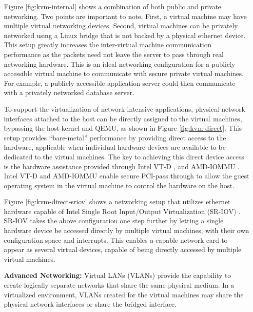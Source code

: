 \begin{enumerate}
Figure \ref{fig:kvm-internal} shows a combination of both public and private networking. Two points are important to note. First, a virtual machine may have multiple virtual networking devices. Second, virtual machines can be privately networked using a Linux bridge that is not backed by a physical ethernet device. This setup greatly increases the inter-virtual machine communication performance as the packets need not leave the server to pass through real networking hardware. This is an ideal networking configuration for a publicly accessible virtual machine to communicate with secure private virtual machines. For example, a publicly accessible application server could then communicate with a privately networked database server.



To support the virtualization of network-intensive applications, physical network interfaces attached to the host can be directly assigned to the virtual machines, bypassing the host kernel and QEMU, as shown in Figure \ref{fig:kvm-direct}. This setup provides ``bare-metal'' performance by providing direct access to the hardware, applicable when individual hardware devices are available to be dedicated to the virtual machines. The key to achieving this direct device access is the hardware assistance provided through Intel VT-D \cite{intelvtd}, and AMD-IOMMU \cite{amd-iommu}. Intel VT-D and AMD-IOMMU enable secure PCI-pass through to allow the guest operating system in the virtual machine to control the hardware on the host.



Figure \ref{fig:kvm-direct-sriov} shows a networking setup that utilizes ethernet hardware capable of Intel Single Root Input/Output Virtualization (SR-IOV) \cite{sr-iov_primer}. SR-IOV takes the above configuration one step further by letting a single hardware device be accessed directly by multiple virtual machines, with their own configuration space and interrupts. This enables a capable network card to appear as several virtual devices, capable of being directly accessed by multiple virtual machines.


\textbf{Advanced Networking: }  Virtual LANs (VLANs) provide the capability to create logically separate networks that share the same physical medium. In a virtualized environment, VLANs created for the virtual machines may share the physical network interfaces or share the bridged interface.


\end{enumerate}

